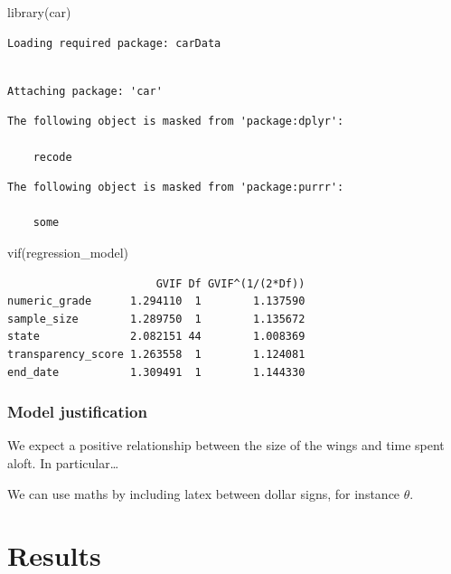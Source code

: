 \documentclass[
  letterpaper,
  DIV=11,
  numbers=noendperiod]{scrartcl}
\newenvironment{Shaded}{\begin{snugshade}}{\end{snugshade}}
\newcommand{\FunctionTok}[1]{\textcolor[rgb]{0.28,0.35,0.67}{#1}}
\newcommand{\NormalTok}[1]{\textcolor[rgb]{0.00,0.23,0.31}{#1}}
\begin{document}
\begin{Shaded}
\begin{Highlighting}[]
\FunctionTok{library}\NormalTok{(car)}
\end{Highlighting}
\end{Shaded}

\begin{verbatim}
Loading required package: carData
\end{verbatim}

\begin{verbatim}

Attaching package: 'car'
\end{verbatim}

\begin{verbatim}
The following object is masked from 'package:dplyr':

    recode
\end{verbatim}

\begin{verbatim}
The following object is masked from 'package:purrr':

    some
\end{verbatim}

\begin{Shaded}
\begin{Highlighting}[]
\FunctionTok{vif}\NormalTok{(regression\_model)}
\end{Highlighting}
\end{Shaded}

\begin{verbatim}
                       GVIF Df GVIF^(1/(2*Df))
numeric_grade      1.294110  1        1.137590
sample_size        1.289750  1        1.135672
state              2.082151 44        1.008369
transparency_score 1.263558  1        1.124081
end_date           1.309491  1        1.144330
\end{verbatim}

\subsubsection{Model justification}\label{model-justification}

We expect a positive relationship between the size of the wings and time
spent aloft. In particular\ldots{}

We can use maths by including latex between dollar signs, for instance
\(\theta\).

\section{Results}\label{results}
\end{document}
